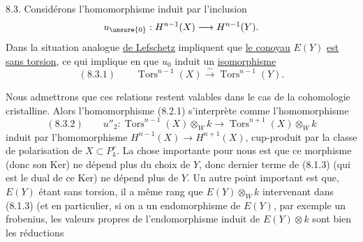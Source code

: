 

8.3. Considérons l'homomorphisme induit par l'inclusion 
\[
u_{\unsure{0}}:H^{n-1}(X)\longrightarrow H^{n-1}(Y).
\]
 Dans la situation analogue  \uline{ de Lefschetz}  impliquent que \uline{le conoyau} $E(Y)$ \uline{est sans torsion}, ce qui implique en  que $u_0$ induit un \uline{isomorphisme}
\[
(8.3.1)\qquad\operatorname{Tors}^{n-1}(X)\xrightarrow{\sim}\operatorname{Tors}^{n-1}(Y).
\]

Nous admettrons que ces relations restent valables dans le cas de la cohomologie cristalline. Alors l'homomorphisme (8.2.1) s'interprète comme l'homomorphisme
\[
(8.3.2)\qquad u''_2:\operatorname{Tors}^{n-1}(X)\otimes_W k\longrightarrow\operatorname{Tors}^{n+1}(X)\otimes_W k
\]
induit par l'homomorphisme $H^{n-1}(X)\to H^{n+1}(X)$, cup-produit par la classe de polarisation de $X\subset P_k^r$. La chose importante pour nous est que ce morphisme (donc son Ker) ne dépend plus du choix de $Y$, donc  dernier terme de (8.1.3)  (qui est le dual de ce Ker) ne dépend plus de $Y$. Un autre point important est que, $E(Y)$ étant sans torsion, il a même rang que $E(Y)\otimes_W k$ intervenant dans (8.1.3) (et en particulier, si on a un endomorphisme de $E(Y)$, par exemple un frobenius, les valeurs propres de l'endomorphisme induit de $E(Y)\otimes k$ sont bien les réductions

